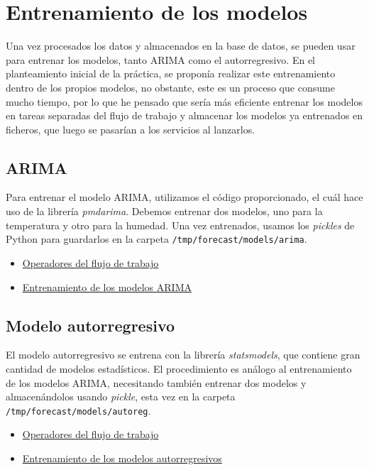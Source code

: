 \section{Entrenamiento de los modelos}
Una vez procesados los datos y almacenados en la base de datos, se
pueden usar para entrenar los modelos, tanto ARIMA como el autorregresivo.
En el planteamiento inicial de la práctica, se proponía realizar este
entrenamiento dentro de los propios modelos, no obstante, este es un proceso
que consume mucho tiempo, por lo que he pensado que sería más eficiente
entrenar los modelos en tareas separadas del flujo de trabajo y almacenar
los modelos ya entrenados en ficheros, que luego se pasarían a los servicios
al lanzarlos.

\subsection{ARIMA}
Para entrenar el modelo ARIMA, utilizamos el código proporcionado, el cuál
hace uso de la librería \textit{pmdarima}. Debemos entrenar dos modelos, uno
para la temperatura y otro para la humedad. Una vez entrenados, usamos
los \textit{pickles} de Python para guardarlos en la carpeta \lstinline{/tmp/forecast/models/arima}.

\begin{itemize}
    \item\href{
        https://github.com/Varrrro/forecast/blob/master/airflow/tasks.py#L103-L123
    }{Operadores del flujo de trabajo}
    \item\href{
        https://github.com/Varrrro/forecast/blob/master/airflow/functions.py#L44-L92
    }{Entrenamiento de los modelos ARIMA}
\end{itemize}

\subsection{Modelo autorregresivo}
El modelo autorregresivo se entrena con la librería \textit{statsmodels},
que contiene gran cantidad de modelos estadísticos. El procedimiento es
análogo al entrenamiento de los modelos ARIMA, necesitando también entrenar
dos modelos y almacenándolos usando \textit{pickle}, esta vez en la carpeta
\lstinline{/tmp/forecast/models/autoreg}.

\begin{itemize}
    \item\href{
        https://github.com/Varrrro/forecast/blob/master/airflow/tasks.py#L125-L145
    }{Operadores del flujo de trabajo}
    \item\href{
        https://github.com/Varrrro/forecast/blob/master/airflow/functions.py#L94-L120
    }{Entrenamiento de los modelos autorregresivos}
\end{itemize}
